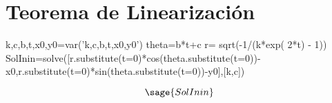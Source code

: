 

 \chapter{Teorema de Linearización}
\begin{sageblock}
k,c,b,t,x0,y0=var('k,c,b,t,x0,y0')
theta=b*t+c
r= sqrt(-1/(k*exp( 2*t) - 1))
SolInin=solve([r.substitute(t=0)*cos(theta.substitute(t=0))-x0,r.substitute(t=0)*sin(theta.substitute(t=0))-y0],[k,c])
\end{sageblock}

\[\sage{SolInin}\]



